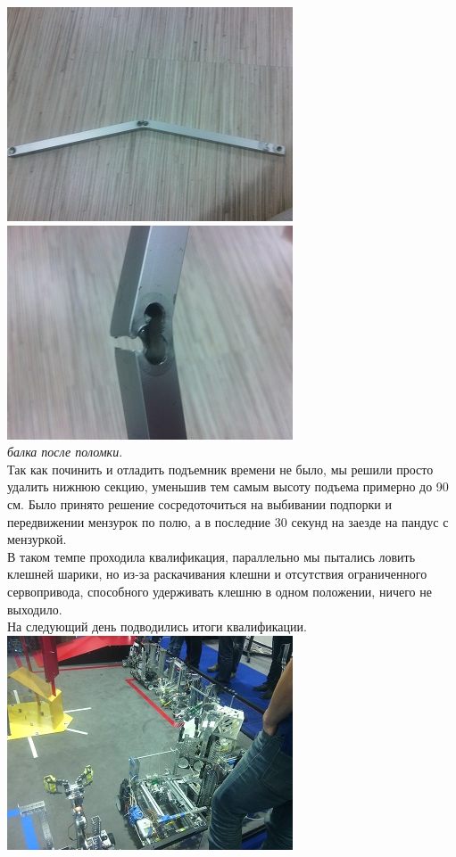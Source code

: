 	\includegraphics{Days/21-24.11.14/11_1_robot.png}
	\includegraphics{Days/21-24.11.14/11_2_robot.png}\\
\emph{балка после поломки}.\\
Так как починить и отладить подъемник времени не было, мы решили просто удалить нижнюю секцию, уменьшив тем самым высоту подъема примерно до 90 см. Было принято решение сосредоточиться на выбивании подпорки и передвижении мензурок по полю, а в последние 30 секунд на заезде на пандус с мензуркой.\\
В таком темпе проходила квалификация, параллельно мы пытались ловить клешней шарики, но из-за раскачивания клешни и отсутствия ограниченного сервопривода, способного удерживать клешню в одном положении, ничего не выходило.\\
На следующий день подводились итоги квалификации.\\
	\includegraphics{Days/21-24.11.14/11_3_robot.png}

